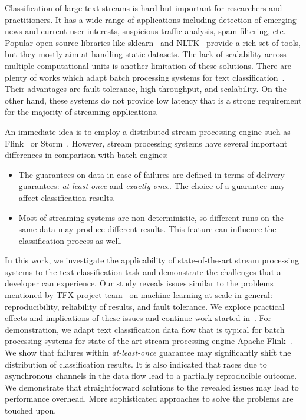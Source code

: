 \label {fs-short-intro}

Classification of large text streams is hard but important for researchers and practitioners. It has a wide range of applications including detection of emerging news and current user interests, suspicious traffic analysis, spam filtering, etc. Popular open-source libraries like sklearn~\cite{scikit-learn} and NLTK~\cite{bird2009natural} provide a rich set of tools, but they mostly aim at handling static datasets. The lack of scalability across multiple computational units is another limitation of these solutions. There are plenty of works which adapt batch processing systems for text classification~\cite{semberecki2016distributed, svyatkovskiy2016large, baltas2016apache}. Their advantages are fault tolerance, high throughput, and scalability. On the other hand, these systems do not provide low latency that is a strong requirement for the majority of streaming applications.

An immediate idea is to employ a distributed stream processing engine such as Flink~\cite{Carbone:2017:SMA:3137765.3137777} or Storm~\cite{apache:storm}. However, stream processing systems have several important differences in comparison with batch engines: 

\begin{itemize}
    \item The guarantees on data in case of failures are defined in terms of delivery guarantees: {\em at-least-once} and {\em exactly-once}. The choice of a guarantee may affect classification results.
    \item Most of streaming systems are non-deterministic, so different runs on the same data may produce different results. This feature can influence the classification process as well.
\end{itemize}

In this work, we investigate the applicability of state-of-the-art stream processing systems to the text classification task and demonstrate the challenges that a developer can experience. Our study reveals issues similar to the problems mentioned by TFX project team~\cite{Baylor:2017:TTP:3097983.3098021} on machine learning at scale in general: reproducibility, reliability of results, and fault tolerance. We explore practical effects and implications of these issues and continue work started in~\cite{we2019debs}. For demonstration, we adapt text classification data flow that is typical for batch processing systems for state-of-the-art stream processing engine Apache Flink~\cite{Carbone:2017:SMA:3137765.3137777}. We show that failures within {\em at-least-once} guarantee may significantly shift the distribution of classification results. It is also indicated that races due to asynchronous channels in the data flow lead to a partially reproducible outcome. We demonstrate that straightforward solutions to the revealed issues may lead to performance overhead. More sophisticated approaches to solve the problems are touched upon.

